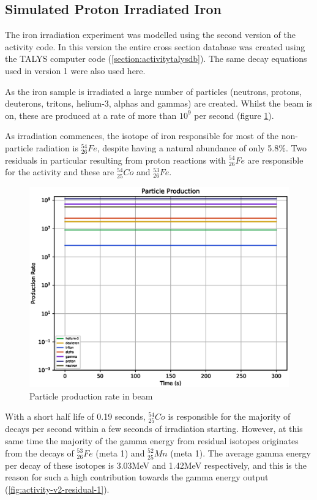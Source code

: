 \subsection{Simulated Proton Irradiated Iron}

The iron irradiation experiment was modelled using the second version of the activity code.  In this version the entire cross section database was created using the TALYS computer code (\ref{section:activitytalysdb}).  The same decay equations used in version 1 were also used here.

As the iron sample is irradiated a large number of particles (neutrons, protons, deuterons, tritons, helium-3, alphas and gammas) are created.  Whilst the beam is on, these are produced at a rate of more than $10^9$ per second (figure \ref{fig:activity-v2-particle-production}).

As irradiation commences, the isotope of iron responsible for most of the non-particle radiation is ${}^{54}_{26} Fe$, despite having a natural abundance of only 5.8\%.  Two residuals in particular resulting from proton reactions with ${}^{54}_{26} Fe$ are responsible for the activity and these are ${}^{54}_{25}Co$ and ${}^{53}_{26}Fe$.  

\begin{figure}[htb]
\centering
\includegraphics[width=0.5\linewidth]{chapters/activity_code/fe-activity-v2/particle_production_in_beam.eps}
\caption{Particle production rate in beam}
\label{fig:activity-v2-particle-production}
\end{figure}

With a short half life of 0.19 seconds, ${}^{54}_{25}Co$ is responsible for the majority of decays per second within a few seconds of irradiation starting.  However, at this same time the majority of the gamma energy from residual isotopes originates from the decays of ${}^{53}_{26}Fe$ (meta 1) and  ${}^{52}_{25}Mn$ (meta 1).  The average gamma energy per decay of these isotopes is 3.03MeV and 1.42MeV respectively, and this is the reason for such a high contribution towards the gamma energy output (\ref{fig:activity-v2-residual-1}).

